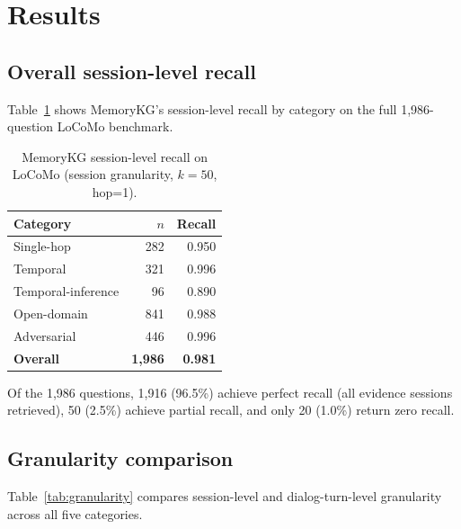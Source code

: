 \documentclass[11pt,a4paper]{article}
\begin{document}
\section{Results}
\label{sec:results}

\subsection{Overall session-level recall}

Table~\ref{tab:category_results} shows MemoryKG's session-level recall by
category on the full 1,986-question LoCoMo benchmark.

\begin{table}[H]
\centering
\caption{MemoryKG session-level recall on LoCoMo (session granularity,
         $k{=}50$, hop=1).}
\label{tab:category_results}
\begin{tabular}{lrr}
  \toprule
  \textbf{Category} & \textbf{$n$} & \textbf{Recall} \\
  \midrule
  Single-hop          & 282 & 0.950 \\
  Temporal            & 321 & 0.996 \\
  Temporal-inference  &  96 & 0.890 \\
  Open-domain         & 841 & 0.988 \\
  Adversarial         & 446 & 0.996 \\
  \midrule
  \textbf{Overall}    & \textbf{1,986} & \textbf{0.981} \\
  \bottomrule
\end{tabular}
\end{table}

Of the 1,986 questions, 1,916 (96.5\%) achieve perfect recall (all evidence
sessions retrieved), 50 (2.5\%) achieve partial recall, and only 20 (1.0\%)
return zero recall.

\subsection{Granularity comparison}
\label{sec:granularity}

Table~\ref{tab:granularity} compares session-level and dialog-turn-level
granularity across all five categories.
\end{document}

